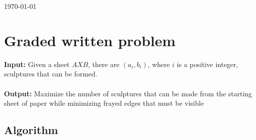 \documentclass[8pt]{article}
\begin{document}
\hfill \small{\today} \\
\setlength{\fboxrule}{.5mm}\setlength{\fboxsep}{1.2mm}
\newlength{\boxlength}\setlength{\boxlength}{\textwidth}
\addtolength{\boxlength}{-4mm}
\begin{center}\end{center}
\vspace{5mm}

\section{Graded written problem}

\textbf{Input:} Given a sheet $A X B$, there are $(a_{i}, b_{i})$, where $i$ is a positive integer, sculptures that can be formed.
\\ \\
\textbf{Output:} Maximize the number of sculptures that can be made from the starting sheet of paper while minimizing frayed edges that must be visible

\subsection{Algorithm}
\end{document}
